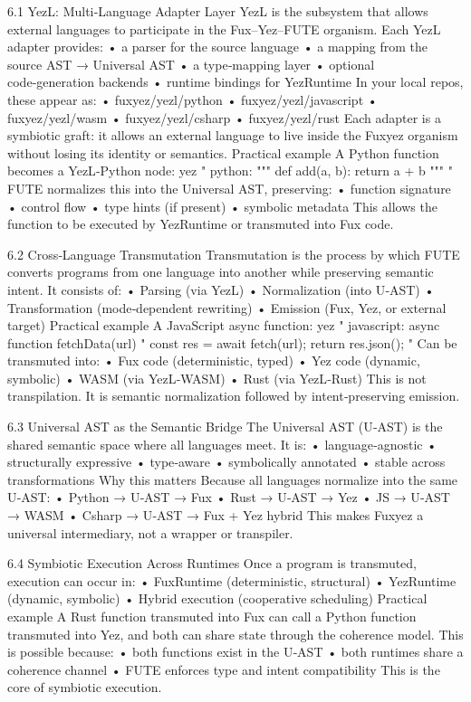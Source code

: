 6.1 YezL: Multi‑Language Adapter Layer
YezL is the subsystem that allows external languages to participate in the Fux–Yez–FUTE organism. Each YezL adapter provides:
• 	a parser for the source language
• 	a mapping from the source AST → Universal AST
• 	a type‑mapping layer
• 	optional code‑generation backends
• 	runtime bindings for YezRuntime
In your local repos, these appear as:
• 	fuxyez/yezl/python
• 	fuxyez/yezl/javascript
• 	fuxyez/yezl/wasm
• 	fuxyez/yezl/csharp
• 	fuxyez/yezl/rust
Each adapter is a symbiotic graft: it allows an external language to live inside the Fuxyez organism without losing its identity or semantics.
Practical example
A Python function becomes a YezL‑Python node:
yez "
    python: """
    def add(a, b): return a + b
    """
"
FUTE normalizes this into the Universal AST, preserving:
• 	function signature
• 	control flow
• 	type hints (if present)
• 	symbolic metadata
This allows the function to be executed by YezRuntime or transmuted into Fux code.

6.2 Cross‑Language Transmutation
Transmutation is the process by which FUTE converts programs from one language into another while preserving semantic intent. It consists of:
• 	Parsing (via YezL)
• 	Normalization (into U‑AST)
• 	Transformation (mode‑dependent rewriting)
• 	Emission (Fux, Yez, or external target)
Practical example
A JavaScript async function:
yez "
    javascript: 
    async function fetchData(url) "
        const res = await fetch(url);
        return res.json();
    "  
Can be transmuted into:
• 	Fux code (deterministic, typed)
• 	Yez code (dynamic, symbolic)
• 	WASM (via YezL‑WASM)
• 	Rust (via YezL‑Rust)
This is not transpilation.
It is semantic normalization followed by intent‑preserving emission.

6.3 Universal AST as the Semantic Bridge
The Universal AST (U‑AST) is the shared semantic space where all languages meet. It is:
• 	language‑agnostic
• 	structurally expressive
• 	type‑aware
• 	symbolically annotated
• 	stable across transformations
Why this matters
Because all languages normalize into the same U‑AST:
• 	Python → U‑AST → Fux
• 	Rust → U‑AST → Yez
• 	JS → U‑AST → WASM
• 	Csharp → U‑AST → Fux + Yez hybrid
This makes Fuxyez a universal intermediary, not a wrapper or transpiler.

6.4 Symbiotic Execution Across Runtimes
Once a program is transmuted, execution can occur in:
• 	FuxRuntime (deterministic, structural)
• 	YezRuntime (dynamic, symbolic)
• 	Hybrid execution (cooperative scheduling)
Practical example
A Rust function transmuted into Fux can call a Python function transmuted into Yez, and both can share state through the coherence model.
This is possible because:
• 	both functions exist in the U‑AST
• 	both runtimes share a coherence channel
• 	FUTE enforces type and intent compatibility
This is the core of symbiotic execution.


